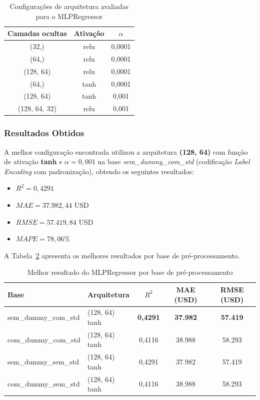 \documentclass[12pt]{article}
\begin{document}
\begin{table}[H]
\centering
\caption{Configurações de arquitetura avaliadas para o MLPRegressor}
\label{tab:mlp_configs}
\begin{tabular}{|c|c|c|}
\hline
\textbf{Camadas ocultas} & \textbf{Ativação} & \textbf{$\alpha$} \\ \hline
(32,) & relu & 0,0001 \\ \hline
(64,) & relu & 0,0001 \\ \hline
(128, 64) & relu & 0,0001 \\ \hline
(64,) & tanh & 0,0001 \\ \hline
(128, 64) & tanh & 0,001 \\ \hline
(128, 64, 32) & relu & 0,001 \\ \hline
\end{tabular}
\end{table}

\subsubsection{Resultados Obtidos}

A melhor configuração encontrada utilizou a arquitetura \textbf{(128, 64)} com função de ativação \textbf{tanh} e $\alpha = 0{,}001$ na base \textit{sem\_dummy\_com\_std} (codificação \textit{Label Encoding} com padronização), obtendo os seguintes resultados:

\begin{itemize}
    \item $R^2 = 0{,}4291$
    \item $MAE = 37.982{,}44$ USD
    \item $RMSE = 57.419{,}84$ USD
    \item $MAPE = 78{,}06\%$
\end{itemize}

A Tabela~\ref{tab:mlp_resultados} apresenta os melhores resultados por base de pré-processamento.

\begin{table}[H]
\centering
\caption{Melhor resultado do MLPRegressor por base de pré-processamento}
\label{tab:mlp_resultados}
\begin{tabular}{|l|l|c|c|c|}
\hline
\textbf{Base} & \textbf{Arquitetura} & \textbf{$R^2$} & \textbf{MAE (USD)} & \textbf{RMSE (USD)} \\ \hline
sem\_dummy\_com\_std & (128, 64) tanh & \textbf{0,4291} & \textbf{37.982} & \textbf{57.419} \\ \hline
com\_dummy\_com\_std & (128, 64) tanh & 0,4116 & 38.988 & 58.293 \\ \hline
sem\_dummy\_sem\_std & (128, 64) tanh & 0,4291 & 37.982 & 57.419 \\ \hline
com\_dummy\_sem\_std & (128, 64) tanh & 0,4116 & 38.988 & 58.293 \\ \hline
\end{tabular}
\end{table}
\end{document}
